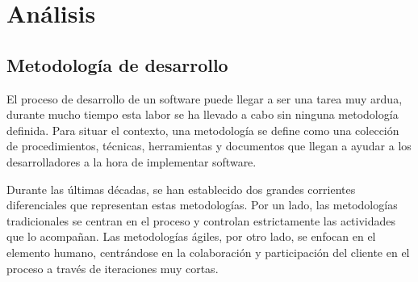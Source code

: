 \chapter{Análisis}\label{ch:analisis}

\section{Metodología de desarrollo}\label{sec:metodologia}

El proceso de desarrollo de un software puede llegar a ser una tarea muy ardua, durante mucho tiempo esta labor se ha llevado a cabo sin ninguna metodología definida. Para situar el contexto, una metodología se define como una colección de procedimientos, técnicas, herramientas y documentos que llegan a ayudar a los desarrolladores a la hora de implementar software. \cite{gomez2010criterios}

\vspace{0.3cm}

Durante las últimas décadas, se han establecido dos grandes corrientes diferenciales que representan estas metodologías. Por un lado, las metodologías tradicionales se centran en el proceso y controlan estrictamente las actividades que lo acompañan. Las metodologías ágiles, por otro lado, se enfocan en el elemento humano, centrándose en la colaboración y participación del cliente en el proceso a través de iteraciones muy cortas. \cite{gomez2010criterios}


